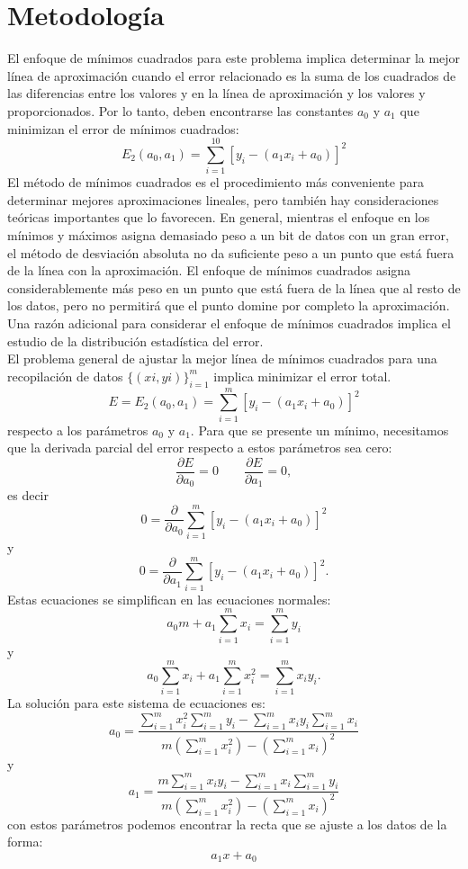 \documentclass[12pt]{article}
\begin{document}
		\section*{\centering Metodología}\label{sec:Metodologia}
			El enfoque de mínimos cuadrados para este problema implica determinar la mejor línea de aproximación 
			cuando el error relacionado es la suma de los cuadrados de las diferencias entre los valores y en la 
			línea de aproximación y los valores y proporcionados. Por lo tanto, deben encontrarse las constantes 
			$ a_0 $ y $ a_1 $ que minimizan el error de mínimos cuadrados:
			$$ E_2(a_0,a_1) = \sum_{i=1}^{10}[y_i - (a_1x_i + a_0)]^2 $$
			El método de mínimos cuadrados es el procedimiento más conveniente para determinar mejores aproximaciones 
			lineales, pero también hay consideraciones teóricas importantes que lo favorecen. En general, mientras 
			el enfoque en los mínimos y máximos asigna demasiado peso a un bit de datos con un gran error, 
			el método de desviación absoluta no da suficiente peso a un punto que está fuera de la línea con la 
			aproximación. El enfoque de mínimos cuadrados asigna considerablemente más peso en un punto que está 
			fuera de la línea que al resto de los datos, pero no permitirá que el punto domine por completo la 
			aproximación. Una razón adicional para considerar el enfoque de mínimos cuadrados implica el estudio 
			de la distribución estadística del error.\\
			El problema general de ajustar la mejor línea de mínimos cuadrados para una recopilación de datos 
			$ \{(xi,yi)\}^m_{i=1} $ implica minimizar el error total.
			$$ E = E_2(a_0,a_1) = \sum_{i=1}^{m}[y_i - (a_1x_i + a_0)]^2 $$
			respecto a los parámetros $ a_0 $ y $ a_1 $. Para que se presente un mínimo, necesitamos que la derivada parcial 
			del error respecto a estos parámetros sea cero:
			$$ \frac{\partial E}{\partial a_0} = 0 \qquad \frac{\partial E}{\partial a_1} = 0, $$
			es decir
			$$ 0 = \frac{\partial}{\partial a_0} \sum_{i=1}^{m}[y_i - (a_1x_i + a_0)]^2 $$
			y
			$$ 0 = \frac{\partial}{\partial a_1} \sum_{i=1}^{m}[y_i - (a_1x_i + a_0)]^2. $$
			Estas ecuaciones se simplifican en las ecuaciones normales:
			$$ a_0 m + a_1 \sum_{i=1}^{m} x_i = \sum_{i=1}^{m} y_i $$
			y
			$$ a_0 \sum_{i=1}^{m} x_i + a_1 \sum_{i=1}^{m} x_i^2 = \sum_{i=1}^{m} x_iy_i. $$
			La solución para este sistema de ecuaciones es:
			$$ a_0 = \frac{\displaystyle \sum_{i=1}^{m} x_i^2 \sum_{i=1}^{m} y_i - \sum_{i=1}^{m} x_iy_i \sum_{i=1}^{m} x_i}{\displaystyle m\left( \sum_{i=1}^{m} x_i^2 \right) - \left( \sum_{i=1}^{m} x_i \right)^2} $$
			y
			$$ a_1 = \frac{\displaystyle m\sum_{i=1}^{m} x_iy_i - \sum_{i=1}^{m} x_i \sum_{i=1}^{m} y_i}{\displaystyle m\left( \sum_{i=1}^{m} x_i^2 \right) - \left( \sum_{i=1}^{m} x_i \right)^2} $$
			con estos parámetros podemos encontrar la recta que se ajuste a los datos de la forma:
			$$ a_1x + a_0 $$
			\cite{bib:item3}
			\newpage
\end{document}
